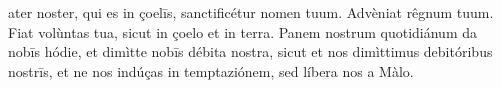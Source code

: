ater noster, qui es in çoelīs, sanctificétur nomen tuum. Advèniat rêgnum tuum. Fiat volùntas tua, sicut in çoelo et in terra. Panem nostrum quotidiánum da nobīs hódie, et dimìtte nobīs débita nostra, sicut et nos dimìttimus debitóribus nostrīs, et ne nos indúças in temptaziónem, sed líbera nos a Màlo.
